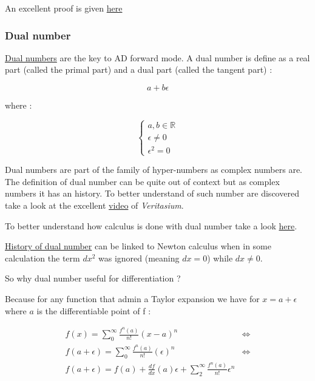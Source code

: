 \documentclass[12pt]{article}
\begin{document}
An excellent proof is given \href{https://math.stackexchange.com/a/3261420/998679}{here}

\subsubsection{Dual number}


\href{https://en.wikipedia.org/wiki/Dual_numbe}{Dual numbers} are the key to AD forward mode. A dual number is define as a real part (called the primal part) and a dual part (called the tangent part) : 

$$
a + b\epsilon
$$

where :

$$
\begin{cases}
a,b \in \mathbb{R} \\
\epsilon \neq 0 \\
\epsilon^2 = 0
\end{cases}
$$


Dual numbers are part of the family of hyper-numbers as complex numbers are.
The definition of dual number can be quite out of context but as complex numbers it has an history. To better understand of such number are discovered take a look at the excellent \href{https://www.youtube.com/watch?v=cUzklzVXJwo&ab_channel=Veritasium}{video} of {\it Veritasium}.

To better understand how calculus is done with dual number take a look \href{https://www.youtube.com/watch?v=ceaNqdHdqtg&t=319s&ab_channel=MichaelPenn}{here}.

\href{https://math.stackexchange.com/questions/341535/is-the-theory-of-dual-numbers-strong-enough-to-develop-real-analysis-and-does-i}{History of dual number} can be linked to Newton calculus when in some calculation the term $dx^2$ was ignored (meaning $dx=0$) while $dx \neq 0$. 

So why dual number useful for differentiation ?

Because for any function that admin a Taylor expansion we have for $x=a+\epsilon$ where $a$ is the differentiable point of f :

\begin{equation*}
    \begin{split}
        f(x) = \sum_0^\infty  \frac{f^n(a)}{n!} (x-a)^n  &\Leftrightarrow \\
        f(a+\epsilon) = \sum_0^\infty  \frac{f^n(a)}{n!} (\epsilon)^n &\Leftrightarrow \\
        f(a+\epsilon) = f(a) + \frac{df}{dx}(a) \epsilon + \sum_2^\infty  \frac{f^n(a)}{n!} \epsilon^n
    \end{split}
\end{equation*}
\end{document}
